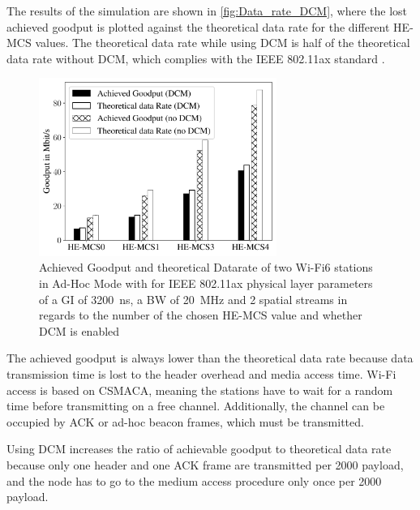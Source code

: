 The results of the simulation are shown in \autoref{fig:Data_rate_DCM}, where the lost achieved goodput is plotted against
the theoretical data rate for the different \ac{HE}-\ac{MCS} values.
The theoretical data rate while using \ac{DCM} is half of the
theoretical data rate without \ac{DCM}, which complies with the IEEE 802.11ax standard \cite{ieee_standard_2021ax}.
\begin{figure}[H]%
   \centering
   \includegraphics[width=0.69\textwidth]{Latex/figures/DCM_dataRate_simulation.pdf}
   \caption{Achieved Goodput and theoretical Datarate of two Wi-Fi6 stations in Ad-Hoc Mode with for IEEE 802.11ax physical layer parameters of a \ac{GI} of \SI{3200}{\nano\second}, a \ac{BW} of \SI{20}{\mega\hertz} and \num{2} spatial streams  in regards to the number of the chosen \ac{HE}-\ac{MCS} value and whether \acf{DCM} is enabled}%
   \label{fig:Data_rate_DCM}%
\end{figure}

The achieved goodput is always lower than the theoretical data rate because data transmission time is lost to the header overhead and media access time.
Wi-Fi access is based on \ac{CSMACA}, meaning the stations have to wait for a random time before transmitting on a free channel.
Additionally, the channel can be occupied by ACK or ad-hoc beacon frames, which must be transmitted.

Using \ac{DCM} increases the ratio of achievable goodput to theoretical data rate because only one header and one ACK frame are transmitted per
\SI{2000}{\byte} payload, and the node has to go to the medium access procedure only once per \SI{2000}{\byte} payload.

